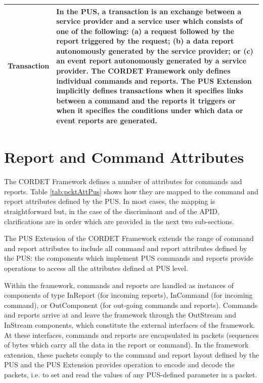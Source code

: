 \documentclass[a4paper,10pt]{article}
\let\stdsection\section
\renewcommand\section{\newpage\stdsection}
\begin{document}
\begin{longtable}{|l|>{\raggedright\arraybackslash}p{10cm}|}
\hline
Transaction & In the PUS, a transaction is an exchange between a service provider and a service user which consists of one of the following: (a) a request followed by the report triggered by the request; (b) a data report autonomously generated by the service provider; or (c) an event report autonomously generated by a service provider. The CORDET Framework only defines individual commands and reports. The PUS Extension implicitly defines transactions when it specifies links between a command and the reports it triggers or when it specifies the conditions under which data or event reports are generated. \\
\hline
\end{longtable} 


\section{Report and Command Attributes}\label{sec:repCmdAttr}
The CORDET Framework defines a number of attributes for commands and reports. Table \ref{tab:pcktAttPus} shows how they are mapped to the command and report attributes defined by the PUS. In most cases, the mapping is straightforward but, in the case of the discriminant and of the APID, clarifications are in order which are provided in the next two sub-sections. 

The PUS Extension of the CORDET Framework extends the range of command and report attributes to include all command and report attributes defined by the PUS: the components which implement PUS commands and reports provide operations to access all the attributes defined at PUS level. 

Within the framework, commands and reports are handled as instances of components of type InReport (for incoming reports), InCommand (for incoming command), or OutComponent (for out-going commands and reports). Commands and reports arrive at and leave the framework through the OutStream and InStream components, which constitute the external interfaces of the framework. At these interfaces, commands and reports are encapsulated in packets (sequences of bytes which carry all the data in the report or command). In the framework extension, these packets comply to the command and report layout defined by the PUS and the PUS Extension provides operation to encode and decode the packets, i.e. to set and read the values of any PUS-defined parameter in a packet. 
\end{document}
